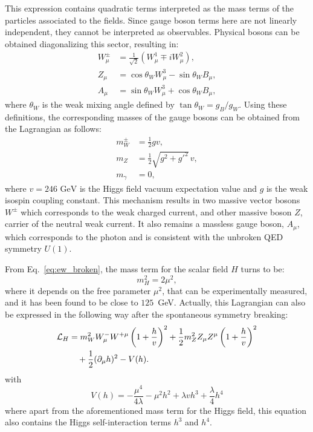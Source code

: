 This expression contains quadratic terms interpreted as the mass terms of the particles associated to the fields. Since gauge boson terms here are not linearly independent, they cannot be interpreted as observables. Physical bosons can be obtained diagonalizing this sector, resulting in:
\begin{align}
W^\pm_\mu &= \frac{1}{\sqrt{2}} \left( W^1_\mu \mp i W^2_\mu \right), \\
Z_\mu &= \cos\theta_W W^3_\mu - \sin\theta_W B_\mu, \\
A_\mu &= \sin\theta_W W^3_\mu + \cos\theta_W B_\mu,
\end{align}
where $\theta_W$ is the weak mixing angle defined by $\tan \theta_W = g_B /g_W$.
Using these definitions, the corresponding masses of the gauge bosons can be obtained from the Lagrangian as follows:
\begin{align}
m^{\pm}_W &= \frac{1}{2} g v, \\
m_Z &= \frac{1}{2} \sqrt{g^2 + g'^2} \, v, \\
m_\gamma &= 0,
\end{align}
where $v = 246 \text{  GeV}$ is the Higgs field vacuum expectation value and $g$ is the weak isospin coupling constant. 
This mechanism results in two massive vector bosons $W^{\pm}$ which corresponds to the weak charged current, and other massive boson $Z$, carrier of the neutral weak current. It also remains a massless gauge boson, $A_{\mu}$, which corresponds to the photon and is consistent with the unbroken QED symmetry $U(1)$.

From Eq.~\ref{eq:ew_broken}, the mass term for the scalar field $H$ turns to be:
\begin{equation}
m_H^2 = 2 \mu^2,
\end{equation}
where it depends on the free parameter $\mu^2$, that can be experimentally measured, and it has been found to be close to $125$~GeV.
Actually, this Lagrangian can also be expressed in the following way after the spontaneous symmetry breaking: 
\begin{align}
\mathcal{L}_{H} &= m_W^2 W^-_{\mu} W^{+\mu} \left( 1 + \frac{h}{v} \right)^2
+ \frac{1}{2} m_Z^2 Z_{\mu} Z^{\mu} \left( 1 + \frac{h}{v} \right)^2 \notag \\
&\quad + \frac{1}{2} (\partial_{\mu} h)^2 - V(h).
\label{allterms}
\end{align}
with
\begin{equation}
    V(h) = -\frac{\mu^{4}}{4\lambda} - \mu^2h^2 + \lambda v h^3 + \frac{\lambda}{4}h^4
\label{hcoupl}
\end{equation}
where apart from the aforementioned mass term for the Higgs field, this equation also contains the Higgs self-interaction terms $h^3$ and $h^4$. 

